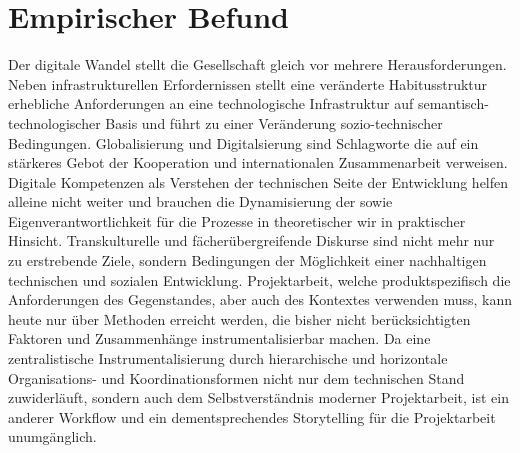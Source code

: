 \documentclass[a4paper,11pt]{article}
\begin{document}
\section*{Empirischer Befund}

Der digitale Wandel stellt die Gesellschaft gleich vor mehrere
Herausforderungen.  Neben infrastrukturellen Erfordernissen stellt eine
veränderte Habitusstruktur erhebliche Anforderungen an eine technologische
Infrastruktur auf semantisch-technologischer Basis und führt zu einer
Veränderung sozio-technischer Bedingungen. Globalisierung und Digitalsierung
sind Schlagworte die auf ein stärkeres Gebot der Kooperation und
internationalen Zusammenarbeit verweisen. Digitale Kompetenzen als Verstehen
der technischen Seite der Entwicklung helfen alleine nicht weiter und brauchen
die Dynamisierung der sowie Eigenverantwortlichkeit für die Prozesse in
theoretischer wir in praktischer Hinsicht. Transkulturelle und
fächerübergreifende Diskurse sind nicht mehr nur zu erstrebende Ziele, sondern
Bedingungen der Möglichkeit einer nachhaltigen technischen und sozialen
Entwicklung. Projektarbeit, welche produktspezifisch die Anforderungen des
Gegenstandes, aber auch des Kontextes verwenden muss, kann heute nur über
Methoden erreicht werden, die bisher nicht berücksichtigten Faktoren und
Zusammenhänge instrumentalisierbar machen. Da eine zentralistische
Instrumentalisierung durch hierarchische und horizontale Organisations- und
Koordinationsformen nicht nur dem technischen Stand zuwiderläuft, sondern auch
dem Selbstverständnis moderner Projektarbeit, ist ein anderer Workflow und ein
dementsprechendes Storytelling für die Projektarbeit unumgänglich.
\end{document}
